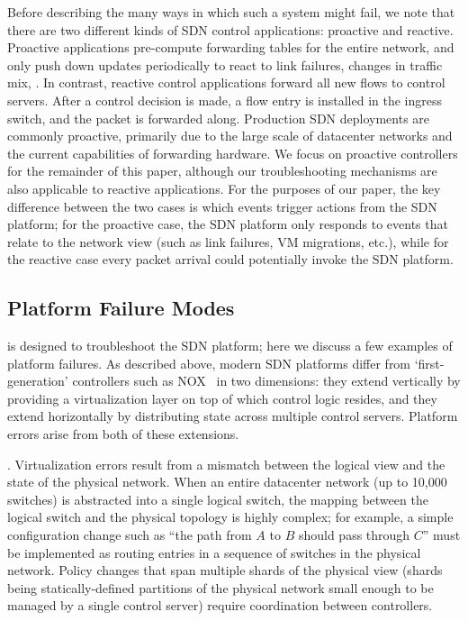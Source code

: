 Before describing the many ways in which such a system might fail, we note that there are two different kinds of SDN control applications: proactive and reactive.
Proactive applications pre-compute forwarding tables for the entire network,
and only push down updates periodically to react to link failures, changes in
traffic mix, \etc. In contrast, reactive control applications forward all new flows to
control servers. After a control decision is made, a flow entry is installed
in the ingress switch, and the packet is forwarded along.
Production SDN deployments are commonly proactive, primarily due to the large
scale of datacenter networks and the current capabilities of forwarding hardware.
We focus on proactive controllers for the remainder of this paper,
although our troubleshooting mechanisms are also applicable to reactive
applications. For the purposes of our paper, the key difference between the two cases is which events trigger actions from the SDN platform; for the proactive case, the SDN platform only responds to events that relate to the network view (such as link failures, VM migrations, etc.), while for the reactive case every packet arrival could potentially invoke the SDN platform.

\subsection{Platform Failure Modes}

\projectname{} is designed to troubleshoot the SDN platform; here we discuss a few examples of platform failures. 
As described above, modern SDN platforms differ from
`first-generation' controllers such as NOX~\cite{nox} in two dimensions: 
they extend vertically by providing a virtualization layer on top of
which control logic resides, and they extend horizontally by
distributing state across multiple control servers. Platform errors arise from both of
these extensions.

. Virtualization errors result from a mismatch between the logical
view and the state of the physical network. When an entire datacenter
network (up to 10,000 switches) is abstracted into a single logical switch,
the mapping between the logical switch and the
physical topology is highly complex; for example, a simple configuration
change such as ``the path from $A$
 to $B$ should pass through $C$'' must be implemented as routing entries in a sequence
of switches in the physical network. Policy changes 
that span multiple shards of the physical view (shards being statically-defined
partitions of the physical network small enough to be managed by a single control
server) require coordination between controllers. 

